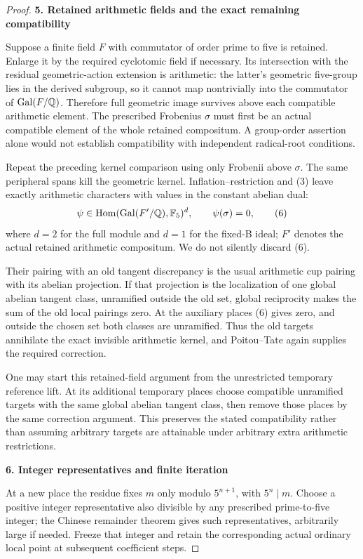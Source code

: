 \begin{proof}
\par\medskip\noindent\textbf{5. Retained arithmetic fields and the exact remaining compatibility}\par\nobreak\smallskip
Suppose a finite field $F$ with commutator of order prime to five is retained. Enlarge it by the required cyclotomic field if necessary. Its intersection with the residual geometric-action extension is arithmetic: the latter's geometric five-group lies in the derived subgroup, so it cannot map nontrivially into the commutator of $\operatorname{Gal}(F/\mathbb Q)$. Therefore full geometric image survives above each compatible arithmetic element. The prescribed Frobenius $\sigma$ must first be an actual compatible element of the whole retained compositum. A group-order assertion alone would not establish compatibility with independent radical-root conditions.

Repeat the preceding kernel comparison using only Frobenii above $\sigma$. The same peripheral spans kill the geometric kernel. Inflation--restriction and (3) leave exactly arithmetic characters with values in the constant abelian dual:
\[
 \psi\in\operatorname{Hom}(\operatorname{Gal}(F'/\mathbb Q),\mathbb F_5)^d,
 \qquad \psi(\sigma)=0,
 \tag{6}
\]
where $d=2$ for the full module and $d=1$ for the fixed-B ideal; $F'$ denotes the actual retained arithmetic compositum. We do not silently discard (6).

Their pairing with an old tangent discrepancy is the usual arithmetic cup pairing with its abelian projection. If that projection is the localization of one global abelian tangent class, unramified outside the old set, global reciprocity makes the sum of the old local pairings zero. At the auxiliary places (6) gives zero, and outside the chosen set both classes are unramified. Thus the old targets annihilate the exact invisible arithmetic kernel, and Poitou--Tate again supplies the required correction.

One may start this retained-field argument from the unrestricted temporary reference lift. At its additional temporary places choose compatible unramified targets with the same global abelian tangent class, then remove those places by the same correction argument. This preserves the stated compatibility rather than assuming arbitrary targets are attainable under arbitrary extra arithmetic restrictions.

\par\medskip\noindent\textbf{6. Integer representatives and finite iteration}\par\nobreak\smallskip
At a new place the residue fixes $m$ only modulo $5^{n+1}$, with $5^n\mid m$. Choose a positive integer representative also divisible by any prescribed prime-to-five integer; the Chinese remainder theorem gives such representatives, arbitrarily large if needed. Freeze that integer and retain the corresponding actual ordinary local point at subsequent coefficient steps.


\end{proof}
